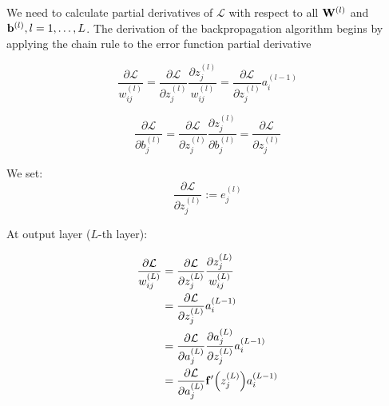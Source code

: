 \documentclass[14pt, a4paper]{article}
\numberwithin{equation}{section}
\numberwithin{algorithm}{section}
\numberwithin{figure}{section}
\begin{document}
We need to calculate partial derivatives of $\mathcal{L}$ with respect to all $\bold{W}^{(l)}$ and $\bold{b}^{(l)}, l=1, \dots, L$.
The derivation of the backpropagation algorithm begins by applying the chain rule to the error function partial derivative

\begin{equation}
  \dfrac{\partial \mathcal{L}}{w_{ij}^{(l)}}=\dfrac{\partial \mathcal{L}}{\partial z_{j}^{(l)}}\dfrac{\partial z_j^{(l)}}{w_{ij}^{(l)}}=\dfrac{\partial \mathcal{L}}{\partial z_{j}^{(l)}}a_i^{(l-1)}
\end{equation}

\begin{equation}
  \dfrac{\partial \mathcal{L}}{\partial b_j^{(l)}}=\dfrac{\partial \mathcal{L}}{\partial z_{j}^{(l)}}\dfrac{\partial z_j^{(l)}}{\partial b_j^{(l)}}=\dfrac{\partial \mathcal{L}}{\partial z_{j}^{(l)}}
\end{equation}

We set:
\begin{equation}
	  \dfrac{\partial \mathcal{L}}{\partial z_{j}^{(l)}}:=e_j^{(l)}
\end{equation}

At output layer ($L$-th layer):

\begin{equation}
	\begin{aligned}
		\dfrac{\partial \mathcal{L}}{w_{ij}^{(L)}}&=\dfrac{\partial \mathcal{L}}{\partial z_{j}^{(L)}}\dfrac{\partial z_j^{(L)}}{w_{ij}^{(L)}}\\&=\dfrac{\partial \mathcal{L}}{\partial z_{j}^{(L)}}a_i^{(L-1)}\\&=\dfrac{\partial\mathcal{L}}{\partial a_j^{(L)}}\dfrac{\partial a_j^{(L)}}{\partial z_j^{(L)}}a_i^{(L-1)}\\&=\dfrac{\partial\mathcal{L}}{\partial a_j^{(L)}}\bold{f}^{\prime}\Big(z_j^{(L)}\Big)a_i^{(L-1)}
	\end{aligned}
\end{equation}
\end{document}
